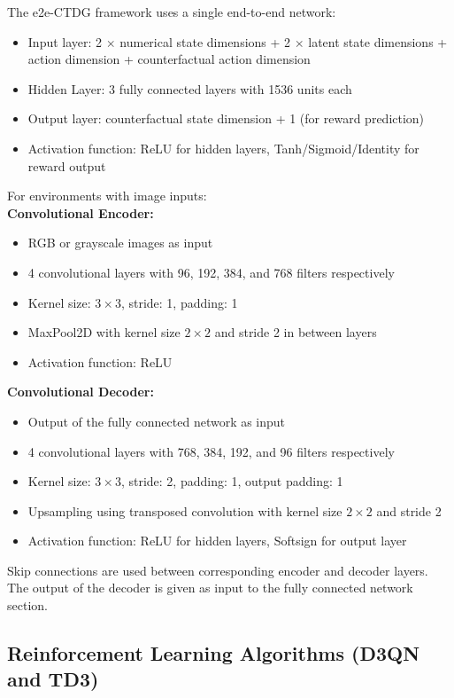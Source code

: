 The e2e-CTDG framework uses a single end-to-end network:
\begin{itemize}
    \item Input layer: 2 $\times$ numerical state dimensions
    + 2 $\times$ latent state dimensions + action dimension
    + counterfactual action dimension
    \item Hidden Layer: 3 fully connected layers with
    1536 units each
    \item Output layer: counterfactual state dimension
    + 1 (for reward prediction)
    \item Activation function: ReLU for hidden layers,
    Tanh/Sigmoid/Identity for reward output
\end{itemize}
For environments with image inputs:\\
\textbf{Convolutional Encoder:}
\begin{itemize}
    \item RGB or grayscale images as input
    \item 4 convolutional layers with 96, 192,
    384, and 768 filters respectively
    \item Kernel size: $3 \times 3$, 
    stride: 1, padding: 1
    \item MaxPool2D with kernel size $2 \times 2$ and
    stride 2 in between layers
    \item Activation function: ReLU
\end{itemize}
\textbf{Convolutional Decoder:}
\begin{itemize}
    \item Output of the fully connected network as input
    \item 4 convolutional layers with 768, 384,
    192, and 96 filters respectively
    \item Kernel size: $3 \times 3$, stride: 2, padding: 1,
    output padding: 1
    \item Upsampling using transposed convolution
    with kernel size $2\times 2$ and stride 2
    \item Activation function: ReLU for hidden layers,
    Softsign for output layer
\end{itemize}
Skip connections are used between corresponding
encoder and decoder layers.
The output of the decoder is given as input
to the fully connected network section.

\subsection{Reinforcement Learning Algorithms (D3QN and TD3)}


